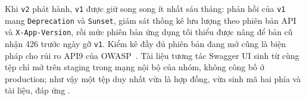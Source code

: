 Khi \texttt{v2} phát hành, \texttt{v1} được giữ song song ít nhất sáu tháng: phản hồi của \texttt{v1} mang \texttt{Deprecation} và \texttt{Sunset}, giám sát thống kê lưu lượng theo phiên bản API và \texttt{X-App-Version}, rồi mức phiên bản ứng dụng tối thiểu được nâng để bản cũ nhận 426 trước ngày gỡ \texttt{v1}. Kiểm kê đầy đủ phiên bản đang mở cũng là biện pháp cho rủi ro API9 của OWASP~\cite{owaspapi}. Tài liệu tương tác Swagger UI sinh từ cùng tệp chỉ mở trên staging trong mạng nội bộ của nhóm, không công bố ở production; như vậy một tệp duy nhất vừa là hợp đồng, vừa sinh mã hai phía và tài liệu, đáp ứng .
